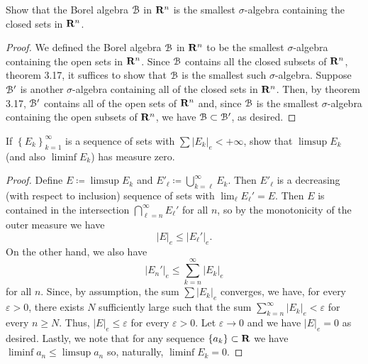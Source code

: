 \begin{problem}
Show that the Borel algebra $\mathcal{B}$ in $\mathbf{R}^n$ is the smallest
$\sigma$-algebra containing the closed sets in $\mathbf{R}^n$.
\end{problem}
\begin{proof}
  We defined the Borel algebra $\mathcal{B}$ in $\mathbf{R}^n$ to be the smallest
  $\sigma$-algebra containing the open sets in $\mathbf{R}^n$. Since $\mathcal{B}$
  contains all the closed subsets of $\mathbf{R}^n$, theorem 3.17, it suffices to
  show that $\mathcal{B}$ is the smallest such $\sigma$-algebra. Suppose $\mathcal{B}'$
  is another $\sigma$-algebra containing all of the closed sets in
  $\mathbf{R}^n$. Then, by theorem 3.17, $\mathcal{B}'$ contains all of the open sets
  of $\mathbf{R}^n$ and, since $\mathcal{B}$ is the smallest $\sigma$-algebra
  containing the open subsets of $\mathbf{R}^n$, we have $\mathcal{B}\subset\mathcal{B}'$, as
  desired.
\end{proof}
\newpage

\begin{problem}
  If $\left\{E_k\right\}_{k=1}^\infty$ is a sequence of sets with
  $\sum\left|E_k\right|_e<+\infty$, show that $\limsup E_k$ (and also
  $\liminf E_k$) has measure zero.
\end{problem}
\begin{proof}
  Define $E\coloneqq\limsup E_k$ and
  $E'_\ell\coloneqq\bigcup_{k=\ell}^\infty E_k$. Then $E'_\ell$ is a
  decreasing (with respect to inclusion) sequence of sets with
  $\lim_\ell E_\ell'=E$. Then $E$ is contained in the intersection
  $\bigcap_{\ell=n}^\infty E_\ell'$ for all $n$, so by the monotonicity of
  the outer measure we have
  \[
  \left|E\right|_e\leq\left|E_\ell'\right|_e.
\]
On the other hand, we also have
\[
  \left|E_n'\right|_e\leq\sum_{k=n}^\infty\left|E_k\right|_e
\]
for all $n$. Since, by assumption, the sum $\sum\left|E_k\right|_e$
converges, we have, for every $\varepsilon>0$, there exists $N$
sufficiently large such that the sum
$\sum_{k=n}^\infty\left|E_k\right|_e<\varepsilon$ for every $n\geq
N$. Thus, $\left|E\right|_e\leq\varepsilon$ for every $\varepsilon>0$. Let
$\varepsilon\to 0$ and we have $\left|E\right|_e=0$ as desired. Lastly, we
note that for any sequence $\left\{a_k\right\}\subset\mathbf{R}$ we have
$\liminf a_n\leq\limsup a_n$ so, naturally, $\liminf E_k=0$.
\end{proof}
\newpage

